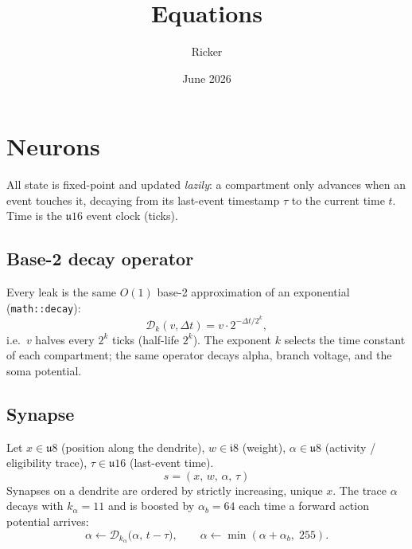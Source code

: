 \documentclass[11pt, a4paper]{article}
\title{Equations}
\author{ Ricker }
\date{June 2026}
\begin{document}
\section{Neurons}

All state is fixed-point and updated \emph{lazily}: a compartment only advances when an event
touches it, decaying from its last-event timestamp $\tau$ to the current time $t$. Time is the
$\mathfrak{u}16$ event clock (ticks).

\subsection{Base-2 decay operator}
Every leak is the same $O(1)$ base-2 approximation of an exponential (\texttt{math::decay}):
\begin{equation}
    \mathcal{D}_k(v, \Delta t) = v \cdot 2^{-\Delta t / 2^{k}},
\end{equation}
i.e.\ $v$ halves every $2^{k}$ ticks (half-life $2^{k}$). The exponent $k$ selects the time constant
of each compartment; the same operator decays alpha, branch voltage, and the soma potential.

\subsection{Synapse}
Let $x \in \mathfrak{u}8$ (position along the dendrite), $w \in \mathfrak{i}8$ (weight),
$\alpha \in \mathfrak{u}8$ (activity / eligibility trace), $\tau \in \mathfrak{u}16$ (last-event time).
\begin{equation}
    s = (x,\,w,\,\alpha,\,\tau)
\end{equation}
Synapses on a dendrite are ordered by strictly increasing, unique $x$. The trace $\alpha$ decays with
$k_\alpha = 11$ and is boosted by $\alpha_b = 64$ each time a forward action potential arrives:
\begin{equation}
    \alpha \leftarrow \mathcal{D}_{k_\alpha}\!\big(\alpha,\, t - \tau\big), \qquad
    \alpha \leftarrow \min(\alpha + \alpha_b,\; 255).
\end{equation}
\end{document}
